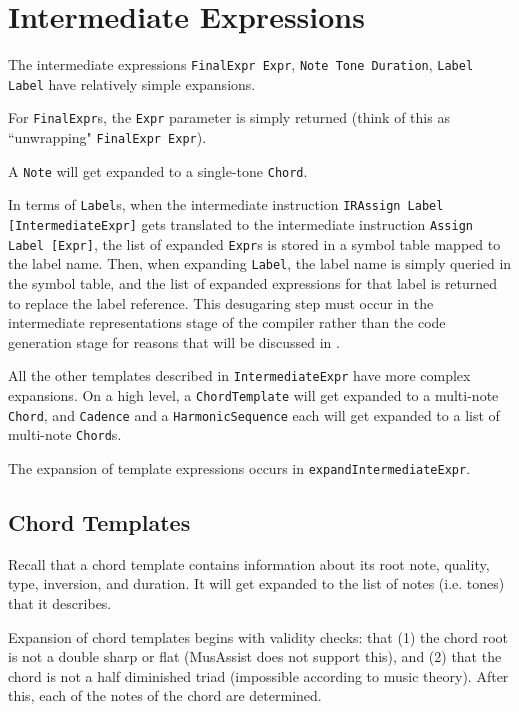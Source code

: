 \documentclass{report}
\begin{document}
\section{Intermediate Expressions}
\label{sec:irexpr}

The intermediate expressions \verb.FinalExpr Expr., \verb.Note Tone Duration., \verb.Label Label. have relatively simple expansions. 

For \verb.FinalExpr.s, the \verb.Expr. parameter is simply returned (think of this as ``unwrapping" \verb.FinalExpr Expr.). 

A \verb.Note. will get expanded to a single-tone \verb.Chord..

In terms of \verb.Label.s, when the intermediate instruction \verb.IRAssign Label [IntermediateExpr]. gets translated to the  intermediate instruction \verb.Assign Label [Expr]., the list of expanded \verb.Expr.s is stored in a symbol table mapped to the label name. Then, when expanding \verb.Label., the label name is simply queried in the symbol table, and the list of expanded expressions for that label is returned to replace the label reference. This desugaring step must occur in the intermediate representations stage of the compiler rather than the code generation stage for reasons that will be discussed in .

All the other templates described in \verb.IntermediateExpr. have more complex expansions. On a high level, a \verb.ChordTemplate. will get expanded to a multi-note \verb.Chord., and \verb.Cadence. and a \verb.HarmonicSequence. each will get expanded to a list of multi-note \verb.Chord.s.

The expansion of template expressions occurs in \verb.expandIntermediateExpr..

\subsection{Chord Templates}
\label{sec:chordtemplates}
Recall that a chord template contains information about its root note, quality, type, inversion, and duration. It will get expanded to the list of notes (i.e. tones) that it describes.

Expansion of chord templates begins with validity checks: that (1) the chord root is not a double sharp or flat (MusAssist does not support this), and (2) that the chord is not a half diminished triad (impossible according to music theory). After this, each of the notes of the chord are determined.
\end{document}
